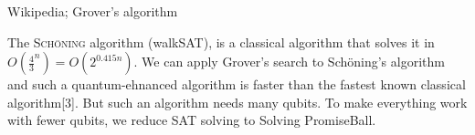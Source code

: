 \documentclass[portrait,a0paper,fontscale=0.285]{baposter} %
\begin{document}
\begin{poster}
{\begin{center}
\begin{tiny}Wikipedia; Grover's algorithm\end{tiny}
\end{center}
\vspace{-0.5em}

The \textcolor{ourred}{\textsc{Sch\"{o}ning}} algorithm (walkSAT), is a classical algorithm that solves it in $O(\frac{4}{3}^{n})=O(2^{0.415n})$. We can apply Grover's search to Sch\"{o}ning's algorithm and such a quantum-ehnanced algorithm is faster than the fastest known classical algorithm[3]. But such an algorithm needs many qubits. To make everything work with fewer qubits, we reduce SAT solving to Solving PromiseBall. 

}


\end{poster}
\end{document}
